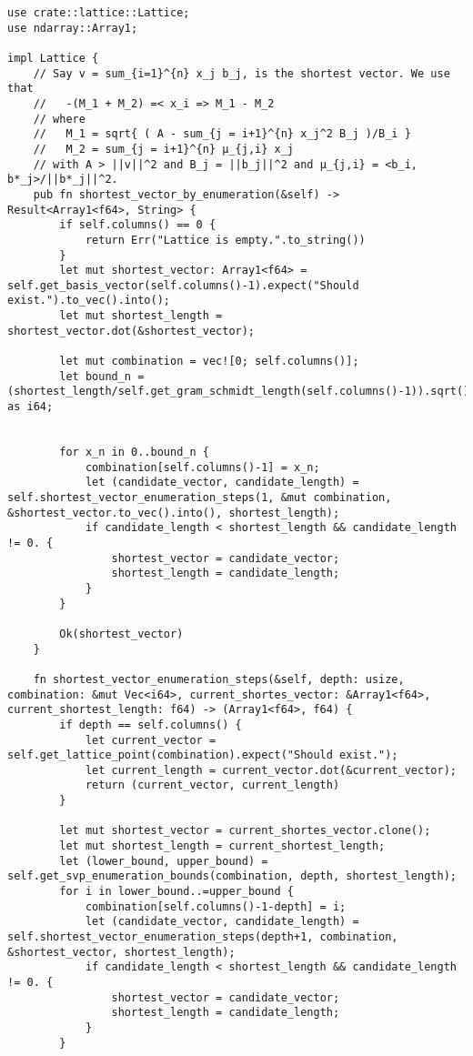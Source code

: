 \begin{verbatim}
use crate::lattice::Lattice;
use ndarray::Array1;

impl Lattice {
    // Say v = sum_{i=1}^{n} x_j b_j, is the shortest vector. We use that
    //   -(M_1 + M_2) =< x_i => M_1 - M_2
    // where
    //   M_1 = sqrt{ ( A - sum_{j = i+1}^{n} x_j^2 B_j )/B_i }
    //   M_2 = sum_{j = i+1}^{n} µ_{j,i} x_j
    // with A > ||v||^2 and B_j = ||b_j||^2 and µ_{j,i} = <b_i, b*_j>/||b*_j||^2.
    pub fn shortest_vector_by_enumeration(&self) -> Result<Array1<f64>, String> {
        if self.columns() == 0 {
            return Err("Lattice is empty.".to_string())
        }
        let mut shortest_vector: Array1<f64> = self.get_basis_vector(self.columns()-1).expect("Should exist.").to_vec().into();
        let mut shortest_length = shortest_vector.dot(&shortest_vector);

        let mut combination = vec![0; self.columns()];
        let bound_n = (shortest_length/self.get_gram_schmidt_length(self.columns()-1)).sqrt().floor() as i64;


        for x_n in 0..bound_n {
            combination[self.columns()-1] = x_n;
            let (candidate_vector, candidate_length) = self.shortest_vector_enumeration_steps(1, &mut combination, &shortest_vector.to_vec().into(), shortest_length);
            if candidate_length < shortest_length && candidate_length != 0. {
                shortest_vector = candidate_vector;
                shortest_length = candidate_length;
            }
        }

        Ok(shortest_vector)
    }

    fn shortest_vector_enumeration_steps(&self, depth: usize, combination: &mut Vec<i64>, current_shortes_vector: &Array1<f64>, current_shortest_length: f64) -> (Array1<f64>, f64) {
        if depth == self.columns() {
            let current_vector = self.get_lattice_point(combination).expect("Should exist.");
            let current_length = current_vector.dot(&current_vector);
            return (current_vector, current_length)
        }

        let mut shortest_vector = current_shortes_vector.clone();
        let mut shortest_length = current_shortest_length;
        let (lower_bound, upper_bound) = self.get_svp_enumeration_bounds(combination, depth, shortest_length);
        for i in lower_bound..=upper_bound {
            combination[self.columns()-1-depth] = i;
            let (candidate_vector, candidate_length) = self.shortest_vector_enumeration_steps(depth+1, combination, &shortest_vector, shortest_length);
            if candidate_length < shortest_length && candidate_length != 0. {
                shortest_vector = candidate_vector;
                shortest_length = candidate_length;
            }
        }


\end{verbatim}

